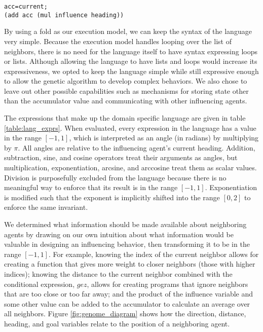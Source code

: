 \begin{lstlisting}[caption={A small genome that sets the agent's heading to the
average of its neighbors' headings},captionpos=b,label={listing:example_genome}]
acc=current;
(add acc (mul influence heading))
\end{lstlisting}

By using a fold as our execution model, we can keep the syntax of the language
very simple.
Because the execution model handles looping over the list of neighbors, there
is no need for the language itself to have syntax expressing loops or lists.
Although allowing the language to have lists and loops would increase its
expressiveness, we opted to keep the language simple while still expressive
enough to allow the genetic algorithm to develop complex behaviors.
We also chose to leave out other possible capabilities such as mechanisms for
storing state other than the accumulator value and communicating with other
influencing agents.

The expressions that make up the domain specific language are given in table
\ref{table:lang_exprs}.
When evaluated, every expression in the language has a value in the range
$[-1,1]$, which is interpreted as an angle (in radians) by multiplying by
$\pi$.
All angles are relative to the influencing agent's current heading.
Addition, subtraction, sine, and cosine operators treat their arguments as
angles, but multiplication, exponentiation, arcsine, and arccosine treat them
as scalar values.
Division is purposefully excluded from the language because there is no
meaningful way to enforce that its result is in the range $[-1, 1]$.
Exponentiation is modified such that the exponent is implicitly shifted into
the range $[0, 2]$ to enforce the same invariant.

We determined what information should be made available about neighboring
agents by drawing on our own intuition about what information would be valuable
in designing an influencing behavior, then transforming it to be in the range
$[-1, 1]$.
For example, knowing the index of the current neighbor allows for creating a
function that gives more weight to closer neighbors (those with higher indices);
knowing the distance to the current neighbor combined with the conditional
expression, $gez$, allows for creating programs that ignore neighbors that are
too close or too far away;
and the product of the influence variable and some other value can be added to
the accumulator to calculate an average over all neighbors.
Figure \ref{fig:genome_diagram} shows how the direction, distance, heading, and
goal variables relate to the position of a neighboring agent.

